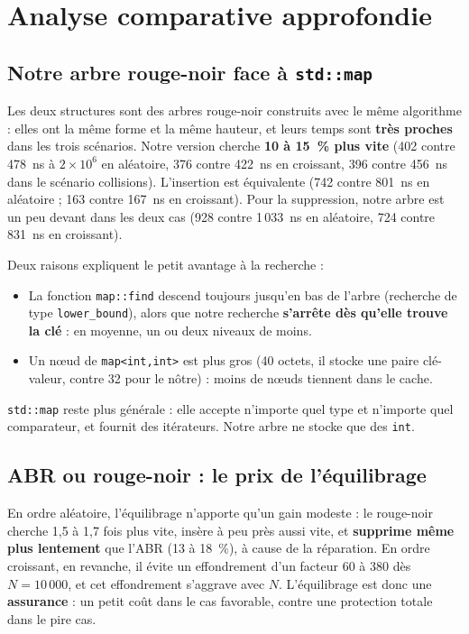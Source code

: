 \documentclass[12pt,a4paper]{report}
\begin{document}
\chapter{Analyse comparative approfondie}

\section{Notre arbre rouge-noir face à \texttt{std::map}}
Les deux structures sont des arbres rouge-noir construits avec le même algorithme : elles ont la même forme et la même hauteur, et leurs temps sont \textbf{très proches} dans les trois scénarios. Notre version cherche \textbf{10 à 15~\% plus vite} (402 contre 478~ns à $2\times10^6$ en aléatoire, 376 contre 422~ns en croissant, 396 contre 456~ns dans le scénario collisions). L'insertion est équivalente (742 contre 801~ns en aléatoire ; 163 contre 167~ns en croissant). Pour la suppression, notre arbre est un peu devant dans les deux cas (928 contre 1\,033~ns en aléatoire, 724 contre 831~ns en croissant).

Deux raisons expliquent le petit avantage à la recherche :
\begin{itemize}
  \item La fonction \texttt{map::find} descend toujours jusqu'en bas de l'arbre (recherche de type \texttt{lower\_bound}), alors que notre recherche \textbf{s'arrête dès qu'elle trouve la clé} : en moyenne, un ou deux niveaux de moins.
  \item Un nœud de \texttt{map<int,int>} est plus gros (40 octets, il stocke une paire clé-valeur, contre 32 pour le nôtre) : moins de nœuds tiennent dans le cache.
\end{itemize}
\texttt{std::map} reste plus générale : elle accepte n'importe quel type et n'importe quel comparateur, et fournit des itérateurs. Notre arbre ne stocke que des \texttt{int}.

\section{ABR ou rouge-noir : le prix de l'équilibrage}
En ordre aléatoire, l'équilibrage n'apporte qu'un gain modeste : le rouge-noir cherche 1,5 à 1,7 fois plus vite, insère à peu près aussi vite, et \textbf{supprime même plus lentement} que l'ABR (13 à 18~\%), à cause de la réparation. En ordre croissant, en revanche, il évite un effondrement d'un facteur 60 à 380 dès $N = 10\,000$, et cet effondrement s'aggrave avec $N$. L'équilibrage est donc une \textbf{assurance} : un petit coût dans le cas favorable, contre une protection totale dans le pire cas.
\end{document}
